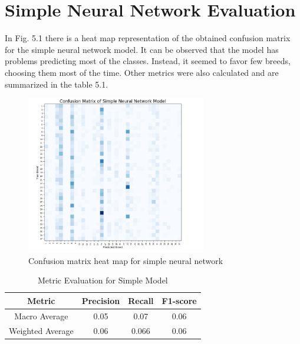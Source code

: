 \section{Simple Neural Network Evaluation}
In Fig. 5.1 there is a heat map representation of the obtained confusion matrix for the simple neural network model. It can be observed that the model has problems predicting most of the classes. Instead, it seemed to favor few breeds, choosing them most of the time. Other metrics were also calculated and are summarized in the table 5.1.
   \begin{figure}[H]
    \centering
    \includegraphics[width=0.7\textwidth]{figures/ssn_cm.png}
    \caption{Confusion matrix heat map for simple neural network}
    \label{fig:example_images}
\end{figure}
\begin{table}[H]
    \centering
    \caption{Metric Evaluation for Simple Model}
    \begin{tabular}{|c|c|c|c|}
        \hline
        Metric & Precision & Recall & F1-score \\ 
        \hline
        Macro Average & 0.05 & 0.07 & 0.06 \\ 
        \hline
        Weighted Average & 0.06 & 0.066 & 0.06 \\ 
        \hline
    \end{tabular}
    \label{tab:simple_model_metrics}
\end{table}


